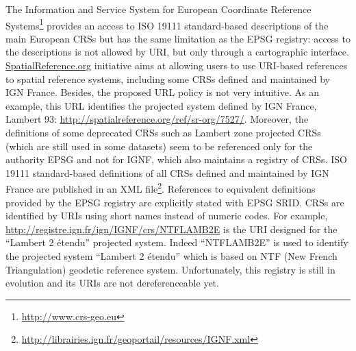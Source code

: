 \begin{table}[!htp]
\end{table}

The Information and Service System for European Coordinate Reference Systems\footnote{\url{http://www.crs-geo.eu}}  provides an access to ISO 19111 standard-based descriptions of the main European CRSs but has the same limitation as the EPSG registry: access to the descriptions is not allowed by URI, but only through a cartographic interface.
\url{SpatialReference.org} initiative aims at allowing users to use URI-based references to spatial reference systems, including some CRSs defined and maintained by IGN France.  Besides, the proposed URL policy is not very intuitive. As an example, this URL identifies the projected system defined by IGN France, Lambert 93: \url{http://spatialreference.org/ref/sr-org/7527/}. Moreover, the definitions of some deprecated CRSs such as Lambert zone projected CRSs (which are still used in some datasets) seem to be referenced only for the authority EPSG and not for IGNF, which also maintains a registry of CRSs. ISO 19111 standard-based definitions of all CRSs defined and maintained by IGN France are  published in an XML file\footnote{\url{ http://librairies.ign.fr/geoportail/resources/IGNF.xml}}.
References to equivalent definitions provided by the EPSG registry are explicitly stated with EPSG SRID. CRSs are identified by URIs using short names instead of numeric codes. For example, \url{http://registre.ign.fr/ign/IGNF/crs/NTFLAMB2E}  is the URI designed for the ``Lambert 2 \'{e}tendu'' projected system. Indeed ``NTFLAMB2E'' is used to identify the projected system ``Lambert 2 \'{e}tendu'' which is based on NTF (New French Triangulation) geodetic reference system. Unfortunately, this registry is still in evolution and its URIs are not dereferenceable yet.

